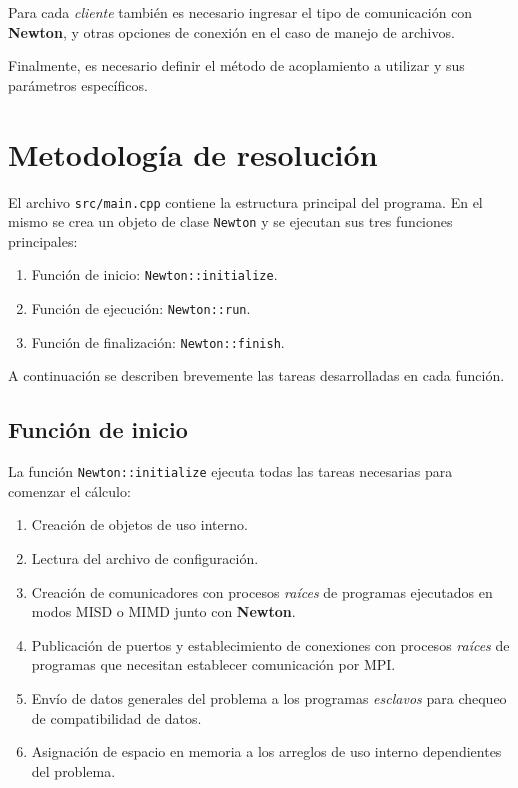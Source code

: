 Para cada \textit{cliente} también es necesario ingresar el tipo de comunicación con \textbf{Newton}, y otras opciones de conexión en el caso de manejo de archivos.

Finalmente, es necesario definir el método de acoplamiento a utilizar y sus parámetros específicos.

\section{Metodología de resolución}
\label{ap2:resolucion}

El archivo \texttt{src/main.cpp} contiene la estructura principal del programa.
En el mismo se crea un objeto de clase \texttt{Newton} y se ejecutan sus tres funciones principales:
\begin{enumerate}
\item Función de inicio: \texttt{Newton::initialize}.
\item Función de ejecución: \texttt{Newton::run}.
\item Función de finalización: \texttt{Newton::finish}.
\end{enumerate}

A continuación se describen brevemente las tareas desarrolladas en cada función.

\subsection*{Función de inicio}
\label{ap2:newton-init}

La función \texttt{Newton::initialize} ejecuta todas las tareas necesarias para comenzar el cálculo:
\begin{enumerate}
\item Creación de objetos de uso interno.
\item Lectura del archivo de configuración.
\item Creación de comunicadores con procesos \textit{raíces} de programas ejecutados en modos MISD o MIMD junto con \textbf{Newton}.
\item Publicación de puertos y establecimiento de conexiones con procesos \textit{raíces} de programas que necesitan establecer comunicación por MPI.
\item Envío de datos generales del problema a los programas \textit{esclavos} para chequeo de compatibilidad de datos.
\item Asignación de espacio en memoria a los arreglos de uso interno dependientes del problema.
\end{enumerate}


